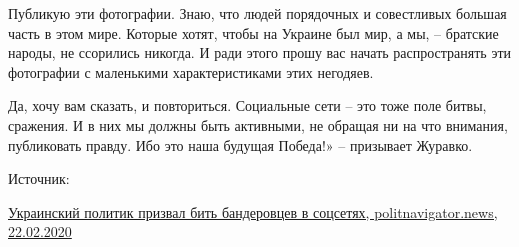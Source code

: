 Публикую эти фотографии. Знаю, что людей порядочных и совестливых большая часть
в этом мире. Которые хотят, чтобы на Украине был мир, а мы, – братские народы,
не ссорились никогда. И ради этого прошу вас начать распространять эти
фотографии с маленькими характеристиками этих негодяев.

Да, хочу вам сказать, и повториться. Социальные сети – это тоже поле битвы,
сражения. И в них мы должны быть активными, не обращая ни на что внимания,
публиковать правду. Ибо это наша будущая Победа!» – призывает Журавко.

Источник: 

\href{https://www.politnavigator.news/ukrainskijj-politik-prizval-bit-banderovcev-v-socsetyakh.html}{%
Украинский политик призвал бить бандеровцев в соцсетях, politnavigator.news, 22.02.2020%
}
